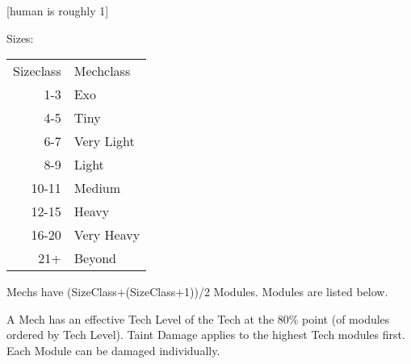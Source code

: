 \documentclass{article}
\begin{document}
    [human is roughly 1]\par
    Sizes:\newline
    \begin{tabular}{r|l}
        Sizeclass &Mechclass \\
        1-3 &Exo\\
        4-5 &Tiny\\
        6-7 &Very Light\\
        8-9 &Light\\
        10-11 &Medium\\
        12-15 &Heavy\\
        16-20 &Very Heavy\\
        21+ &Beyond\\
    \end{tabular}\newline
    Mechs have (SizeClass+(SizeClass+1))/2 Modules. Modules are listed below. \par
    A Mech has an effective Tech Level of the Tech at the 80\% point (of modules ordered by Tech Level).\newline
    Taint Damage applies to the highest Tech modules first. Each Module can be damaged individually.\newline
    \newline
\end{document}
